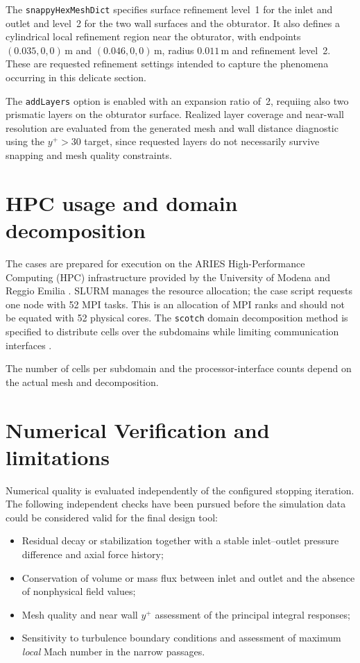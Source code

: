 The \texttt{snappyHexMeshDict} specifies surface refinement level~1 for the inlet and outlet and level~2 for the two wall surfaces and the obturator. It also defines a cylindrical local refinement region near the obturator, with endpoints $(0.035,0,0)\,\mathrm{m}$ and $(0.046,0,0)\,\mathrm{m}$, radius $0.011\,\mathrm{m}$ and refinement level~2. These are requested refinement settings intended to capture the phenomena occurring in this delicate section.

The \texttt{addLayers} option is enabled with an expansion ratio of~2, requiing also two prismatic layers on the obturator surface. Realized layer coverage and near-wall resolution are evaluated from the generated mesh and wall distance diagnostic using the $y^+ > 30$ target, since requested layers do not necessarily survive snapping and mesh quality constraints.

\section{HPC usage and domain decomposition}
\label{sec:hpc_environment}

The cases are prepared for execution on the ARIES High-Performance Computing (HPC) infrastructure provided by the University of Modena and Reggio Emilia \cite{hpc_aries}. SLURM manages the resource allocation; the case script requests one node with 52 MPI tasks. This is an allocation of MPI ranks and should not be equated with 52 physical cores. The \texttt{scotch} domain decomposition method is specified to distribute cells over the subdomains while limiting communication interfaces \cite{pellegrini1996}.

The number of cells per subdomain and the processor-interface counts depend on the actual mesh and decomposition.

\section{Numerical Verification and limitations}
\label{sec:numerical_verification}

Numerical quality is evaluated independently of the configured stopping iteration. The following independent checks have been pursued before the simulation data could be considered valid for the final design tool:
\begin{itemize}
    \item Residual decay or stabilization together with a stable inlet--outlet pressure difference and axial force history;
    \item Conservation of volume or mass flux between inlet and outlet and the absence of nonphysical field values;
    \item Mesh quality and near wall $y^+$ assessment of the principal integral responses;
    \item Sensitivity to turbulence boundary conditions and assessment of maximum \emph{local} Mach number in the narrow passages.
\end{itemize}

